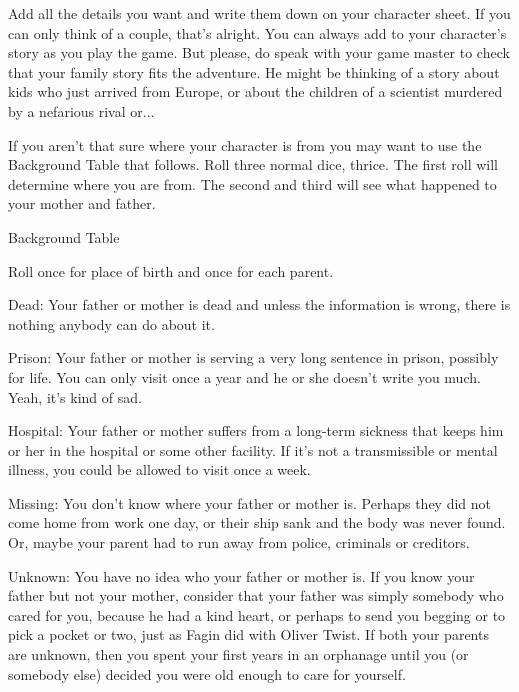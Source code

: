 Add all the details you want and write them down on your character sheet. If you can only think of a couple, that's alright. You can always add to your character's story as you play the game. But please, do speak with your game master to check that your family story fits the adventure. He might be thinking of a story about kids who just arrived from Europe, or about the children of a scientist murdered by a nefarious rival or...


If you aren't that sure where your character is from you may want to use the Background Table that follows. Roll three normal dice, thrice. The first roll will determine where you are from. The second and third will see what happened to your mother and father.


Background Table






          






Roll once for place of birth and once for each parent.


Dead: Your father or mother is dead and unless the information is wrong, there is nothing anybody can do about it.


Prison: Your father or mother is serving a very long sentence in prison, possibly for life. You can only visit once a year and he or she doesn't write you much. Yeah, it's kind of sad.


Hospital: Your father or mother suffers from a long-term sickness that keeps him or her in the hospital or some other facility. If it's not a transmissible or mental illness, you could be allowed to visit once a week.


Missing: You don't know where your father or mother is. Perhaps they did not come home from work one day, or their ship sank and the body was never found. Or, maybe your parent had to run away from police, criminals or creditors.


Unknown: You have no idea who your father or mother is. If you know your father but not your mother, consider that your father was simply somebody who cared for you, because he had a kind heart, or perhaps to send you begging or to pick a pocket or two, just as Fagin did with Oliver Twist. If both your parents are unknown, then you spent your first years in an orphanage until you (or somebody else) decided you were old enough to care for yourself.


